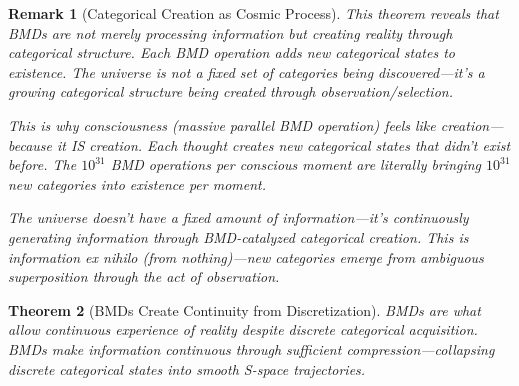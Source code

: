 \documentclass[12pt,a4paper]{article}
\newtheorem{theorem}{Theorem}[section]
\newtheorem{remark}[theorem]{Remark}
\begin{document}
\begin{remark}[Categorical Creation as Cosmic Process]
This theorem reveals that BMDs are not merely processing information but \textit{creating reality} through categorical structure. Each BMD operation adds new categorical states to existence. The universe is not a fixed set of categories being discovered—it's a growing categorical structure being created through observation/selection.

This is why consciousness (massive parallel BMD operation) feels like creation—because it IS creation. Each thought creates new categorical states that didn't exist before. The $10^{31}$ BMD operations per conscious moment are literally bringing $10^{31}$ new categories into existence per moment.

The universe doesn't have a fixed amount of information—it's continuously generating information through BMD-catalyzed categorical creation. This is information ex nihilo (from nothing)—new categories emerge from ambiguous superposition through the act of observation.
\end{remark}

\begin{theorem}[BMDs Create Continuity from Discretization]
\label{thm:bmd_continuity}
BMDs are what allow continuous experience of reality despite discrete categorical acquisition. BMDs make information continuous through sufficient compression—collapsing discrete categorical states into smooth S-space trajectories.
\end{theorem}
\end{document}

